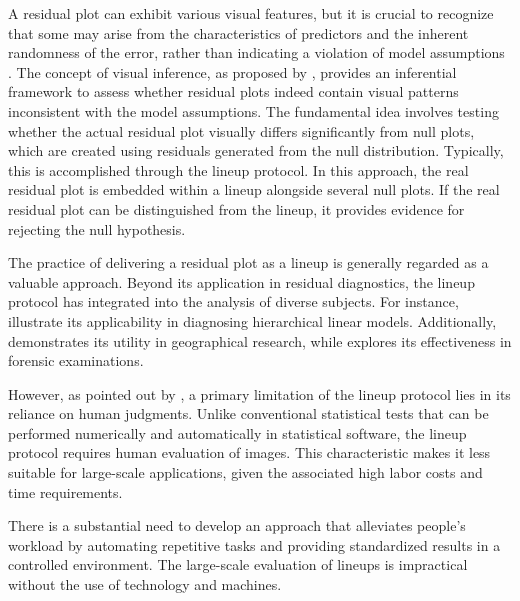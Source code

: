 \documentclass[]{interact}
\theoremstyle{plain}%
\theoremstyle{definition}
\theoremstyle{remark}
\begin{document}
A residual plot can exhibit various visual features, but it is crucial
to recognize that some may arise from the characteristics of predictors
and the inherent randomness of the error, rather than indicating a
violation of model assumptions \citep{li2023plot}. The concept of visual
inference, as proposed by \citet{buja2009statistical}, provides an
inferential framework to assess whether residual plots indeed contain
visual patterns inconsistent with the model assumptions. The fundamental
idea involves testing whether the actual residual plot visually differs
significantly from null plots, which are created using residuals
generated from the null distribution. Typically, this is accomplished
through the lineup protocol. In this approach, the real residual plot is
embedded within a lineup alongside several null plots. If the real
residual plot can be distinguished from the lineup, it provides evidence
for rejecting the null hypothesis.

The practice of delivering a residual plot as a lineup is generally
regarded as a valuable approach. Beyond its application in residual
diagnostics, the lineup protocol has integrated into the analysis of
diverse subjects. For instance,
\cite{loy2013diagnostic, loy2014hlmdiag, loy2015you} illustrate its
applicability in diagnosing hierarchical linear models. Additionally,
\citet{widen2016graphical} demonstrates its utility in geographical
research, while \citet{krishnan2021hierarchical} explores its
effectiveness in forensic examinations.

However, as pointed out by \citet{li2023plot}, a primary limitation of
the lineup protocol lies in its reliance on human judgments. Unlike
conventional statistical tests that can be performed numerically and
automatically in statistical software, the lineup protocol requires
human evaluation of images. This characteristic makes it less suitable
for large-scale applications, given the associated high labor costs and
time requirements.

There is a substantial need to develop an approach that alleviates
people's workload by automating repetitive tasks and providing
standardized results in a controlled environment. The large-scale
evaluation of lineups is impractical without the use of technology and
machines.
\end{document}
